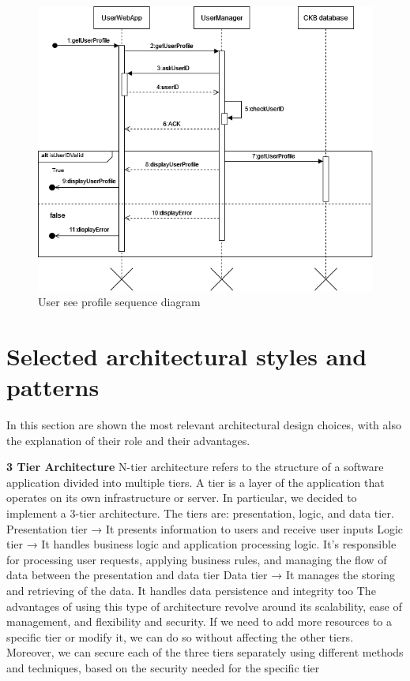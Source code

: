 \begin{figure}[H]
    \begin{center}
        \includegraphics[width=\linewidth]{Images/sequence/Sd_seeUserProfile.png}
        \caption{User see profile sequence diagram}
        \label{fig:User_see_profile}
    \end{center}
\end{figure}
\newpage

\section{Selected architectural styles and patterns}

In this section are shown the most relevant architectural design choices, with also the explanation of their role and their advantages.

\textbf{3 Tier Architecture}\newline
N-tier architecture refers to the structure of a software application divided into multiple tiers. 
A tier is a layer of the application that operates on its own infrastructure or server. 
In particular, we decided to implement a 3-tier architecture. The tiers are: presentation, logic, and data tier.\newline
Presentation tier → It presents information to users and receive user inputs\newline
Logic tier → It handles business logic and application processing logic. It’s responsible for processing user requests, 
applying business rules, and managing the flow of data between the presentation and data tier\newline
Data tier → It manages the storing and retrieving of the data. It handles data persistence and integrity too\newline
The advantages of using this type of architecture revolve around its scalability, ease of management, and flexibility and security. 
If we need to add more resources to a specific tier or modify it, we can do so without affecting the other tiers. Moreover, we can secure each 
of the three tiers separately using different methods and techniques, based on the security needed for the specific tier

